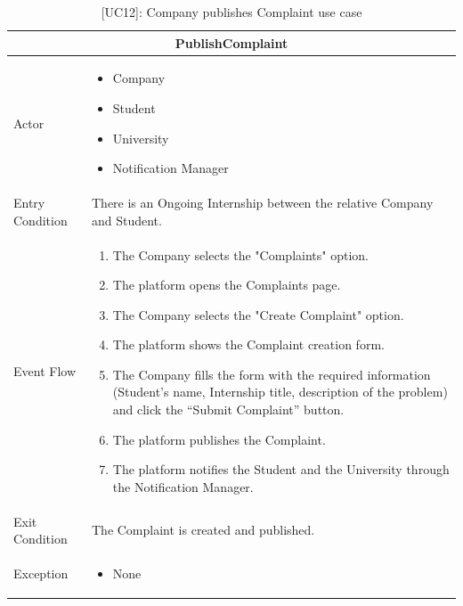 \begin{table}[H]
    \centering
    \begin{tabular}{|p{3cm}|p{12cm}|}
    \hline
    \multicolumn{2}{|c|}{\textbf{PublishComplaint}} \\ \hline
    Actor & 
    \begin{itemize}
        \item Company
        \item Student
        \item University
        \item Notification Manager
    \end{itemize} \\ \hline
    Entry Condition & There is an Ongoing Internship between the relative Company and Student.\\ \hline
    Event Flow &      
    \begin{enumerate}         
        \item The Company selects the "Complaints" option.
        \item The platform opens the Complaints page.
        \item The Company selects the "Create Complaint" option.
        \item The platform shows the Complaint creation form.
        \item The Company fills the form with the required information (Student's name, Internship title, description of the problem) and click the “Submit Complaint” button.
        \item The platform publishes the Complaint.
        \item The platform notifies the Student and the University through the Notification Manager.
    \end{enumerate} \\ \hline
    Exit Condition & The Complaint is created and published. \\ \hline
    Exception & 
    \begin{itemize}       
        \item None
    \end{itemize} \\ \hline
    \end{tabular}
    \caption{[UC12]: Company publishes Complaint use case}
    \label{tab:UC12}
\end{table}

